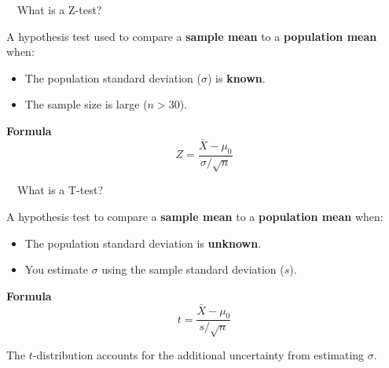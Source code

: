 \documentclass[aspectratio=169,11pt]{beamer}
\begin{document}
\begin{frame}{\ \ What is a Z-test?}
  \begin{keybox}
    A hypothesis test used to compare a \textbf{sample mean} to a
    \textbf{population mean} when:
    \begin{itemize}
      \item The population standard deviation ($\sigma$) is \textbf{known}.
      \item The sample size is large ($n > 30$).
    \end{itemize}
  \end{keybox}
  \vspace{0.6em}
  \begin{center}
    \textbf{\color{qrnavy}Formula}
    \begin{equation*}
      Z = \frac{\bar{X}-\mu_0}{\sigma/\sqrt{n}}
    \end{equation*}
  \end{center}
\end{frame}

\begin{frame}{\ \ What is a T-test?}
  \begin{keybox}
    A hypothesis test to compare a \textbf{sample mean} to a
    \textbf{population mean} when:
    \begin{itemize}
      \item The population standard deviation is \textbf{unknown}.
      \item You estimate $\sigma$ using the sample standard deviation ($s$).
    \end{itemize}
  \end{keybox}
  \vspace{0.4em}
  \begin{center}
    \textbf{\color{qrnavy}Formula}
    \begin{equation*}
      t = \frac{\bar{X}-\mu_0}{s/\sqrt{n}}
    \end{equation*}
  \end{center}
  \vspace{0.2em}
  \begin{center}
    {\small The $t$-distribution accounts for the additional uncertainty from
    estimating $\sigma$.}
  \end{center}
\end{frame}
\end{document}
